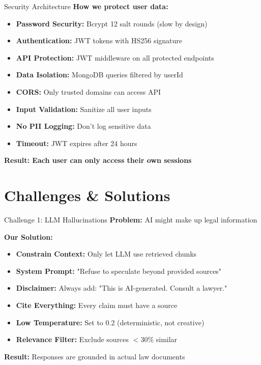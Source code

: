 \documentclass[11pt,aspectratio=16:9]{beamer}
\begin{document}
\begin{frame}{Security Architecture}
    \textbf{How we protect user data:}
    
    \vspace{0.5cm}
    
    \begin{itemize}
        \item \textbf{Password Security:} Bcrypt 12 salt rounds (slow by design)
        \item \textbf{Authentication:} JWT tokens with HS256 signature
        \item \textbf{API Protection:} JWT middleware on all protected endpoints
        \item \textbf{Data Isolation:} MongoDB queries filtered by userId
        \item \textbf{CORS:} Only trusted domains can access API
        \item \textbf{Input Validation:} Sanitize all user inputs
        \item \textbf{No PII Logging:} Don't log sensitive data
        \item \textbf{Timeout:} JWT expires after 24 hours
    \end{itemize}
    
    \vspace{0.8cm}
    
    {\small \textbf{Result: Each user can only access their own sessions}}
\end{frame}

\section{Challenges \& Solutions}

\begin{frame}{Challenge 1: LLM Hallucinations}
    \textbf{Problem:} AI might make up legal information
    
    \vspace{0.5cm}
    
    \textbf{Our Solution:}
    \begin{itemize}
        \item \textbf{Constrain Context:} Only let LLM use retrieved chunks
        \item \textbf{System Prompt:} "Refuse to speculate beyond provided sources"
        \item \textbf{Disclaimer:} Always add: "This is AI-generated. Consult a lawyer."
        \item \textbf{Cite Everything:} Every claim must have a source
        \item \textbf{Low Temperature:} Set to 0.2 (deterministic, not creative)
        \item \textbf{Relevance Filter:} Exclude sources $<30\%$ similar
    \end{itemize}
    
    \vspace{0.5cm}
    
    \textbf{Result:} Responses are grounded in actual law documents
\end{frame}
\end{document}
